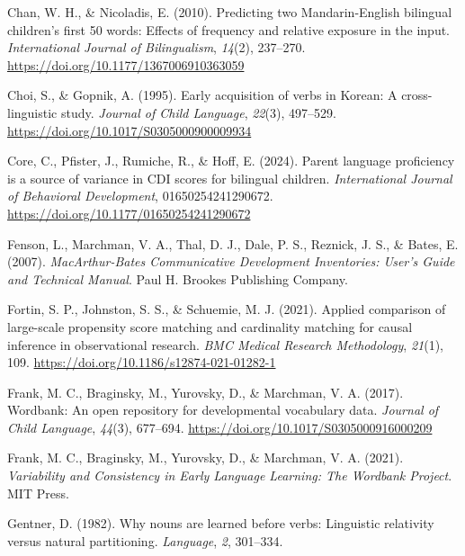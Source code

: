 \documentclass[10pt, letterpaper]{article}
\begin{document}
\begin{CSLReferences}{1}{0}
Chan, W. H., \& Nicoladis, E. (2010). Predicting two {Mandarin-English}
bilingual children's first 50 words: {Effects} of frequency and relative
exposure in the input. \emph{International Journal of Bilingualism},
\emph{14}(2), 237--270. \url{https://doi.org/10.1177/1367006910363059}

Choi, S., \& Gopnik, A. (1995). Early acquisition of verbs in {Korean}:
A cross-linguistic study. \emph{Journal of Child Language},
\emph{22}(3), 497--529. \url{https://doi.org/10.1017/S0305000900009934}

Core, C., Pfister, J., Rumiche, R., \& Hoff, E. (2024). Parent language
proficiency is a source of variance in {CDI} scores for bilingual
children. \emph{International Journal of Behavioral Development},
01650254241290672. \url{https://doi.org/10.1177/01650254241290672}

Fenson, L., Marchman, V. A., Thal, D. J., Dale, P. S., Reznick, J. S.,
\& Bates, E. (2007). \emph{{MacArthur-Bates Communicative Development
Inventories}: {User}'s {Guide} and {Technical Manual}}. Paul H. Brookes
Publishing Company.

Fortin, S. P., Johnston, S. S., \& Schuemie, M. J. (2021). Applied
comparison of large-scale propensity score matching and cardinality
matching for causal inference in observational research. \emph{BMC
Medical Research Methodology}, \emph{21}(1), 109.
\url{https://doi.org/10.1186/s12874-021-01282-1}

Frank, M. C., Braginsky, M., Yurovsky, D., \& Marchman, V. A. (2017).
Wordbank: An open repository for developmental vocabulary data.
\emph{Journal of Child Language}, \emph{44}(3), 677--694.
\url{https://doi.org/10.1017/S0305000916000209}

Frank, M. C., Braginsky, M., Yurovsky, D., \& Marchman, V. A. (2021).
\emph{Variability and {Consistency} in {Early Language Learning}: {The
Wordbank Project}}. MIT Press.

Gentner, D. (1982). Why nouns are learned before verbs: {Linguistic}
relativity versus natural partitioning. \emph{Language}, \emph{2},
301--334.


\end{CSLReferences}
\end{document}
